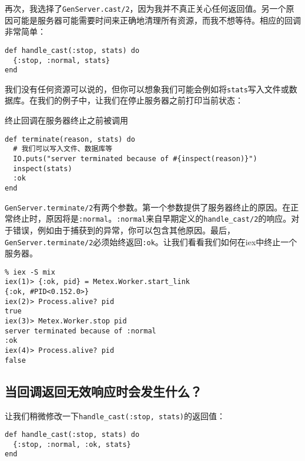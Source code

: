 再次，我选择了\texttt{GenServer.cast/2}，因为我并不真正关心任何返回值。另一个原因可能是服务器可能需要时间来正确地清理所有资源，而我不想等待。相应的回调非常简单：

\begin{code}{}
\begin{verbatim}
def handle_cast(:stop, stats) do
  {:stop, :normal, stats}
end
\end{verbatim}
\end{code}

我们没有任何资源可以说的，但你可以想象我们可能会例如将\texttt{stats}写入文件或数据库。在我们的例子中，让我们在停止服务器之前打印当前状态：

\begin{code}{终止回调在服务器终止之前被调用}
\begin{verbatim}
def terminate(reason, stats) do
  # 我们可以写入文件、数据库等
  IO.puts("server terminated because of #{inspect(reason)}")
  inspect(stats)
  :ok
end
\end{verbatim}
\label{lst:stop_callback_before_server_terminates}
\end{code}

\texttt{GenServer.terminate/2}有两个参数。第一个参数提供了服务器终止的原因。在正常终止时，原因将是\texttt{:normal}。\texttt{:normal}来自早期定义的\texttt{handle\_cast/2}的响应。对于错误，例如由于捕获到的异常，你可以包含其他原因。最后，\texttt{GenServer.terminate/2}必须始终返回\texttt{:ok}。让我们看看我们如何在iex中终止一个服务器。

\begin{code}{}
\begin{verbatim}
% iex -S mix
iex(1)> {:ok, pid} = Metex.Worker.start_link
{:ok, #PID<0.152.0>}
iex(2)> Process.alive? pid
true
iex(3)> Metex.Worker.stop pid
server terminated because of :normal
:ok
iex(4)> Process.alive? pid
false
\end{verbatim}
\end{code}


\subsection{当回调返回无效响应时会发生什么？}

让我们稍微修改一下\texttt{handle\_cast(:stop, stats)}的返回值：

\begin{code}{}
\begin{verbatim}
def handle_cast(:stop, stats) do
  {:stop, :normal, :ok, stats}
end
\end{verbatim}
\end{code}


